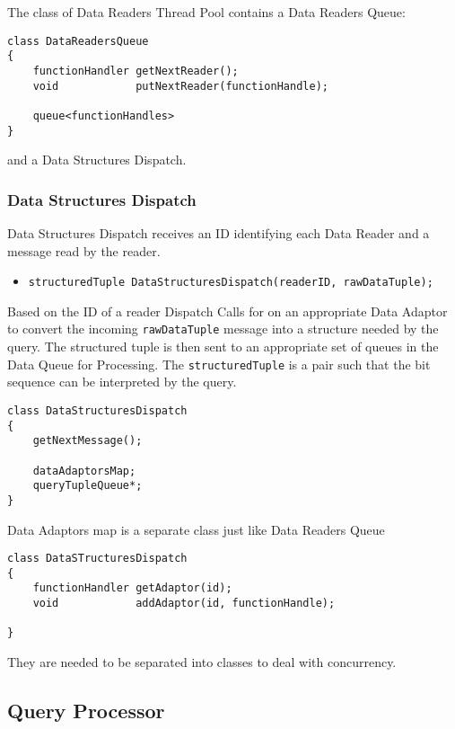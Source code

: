 \documentclass[11pt]{article}
\begin{document}
\noindent The class of Data Readers Thread Pool contains a Data Readers Queue:

\begin{verbatim}
class DataReadersQueue
{
	functionHandler getNextReader();
	void            putNextReader(functionHandle);
	
    queue<functionHandles>
}
\end{verbatim}

\noindent and a Data Structures Dispatch.

\subsubsection{Data Structures Dispatch}

Data Structures Dispatch receives an ID identifying each Data Reader and a message read by the reader. 

\begin{itemize}
	\item {\tt structuredTuple DataStructuresDispatch(readerID, rawDataTuple);}
\end{itemize}

Based on the ID of a reader Dispatch Calls for on an appropriate Data Adaptor to convert the incoming {\tt rawDataTuple} message into a structure needed by the query. The structured tuple is then sent to an appropriate set of queues in the Data Queue for Processing. The {\tt structuredTuple} is a pair {\tt <size, bit-sequence>} such that the bit sequence can be interpreted by the query. 

\begin{verbatim}
class DataStructuresDispatch
{
	getNextMessage();
	
    dataAdaptorsMap;
    queryTupleQueue*;
}
\end{verbatim}

\noindent Data Adaptors map is a separate class just like Data Readers Queue

\begin{verbatim}
class DataSTructuresDispatch
{
    functionHandler getAdaptor(id);
    void            addAdaptor(id, functionHandle);
	
}
\end{verbatim}
\noindent They are needed to be separated into classes to deal with concurrency.

\subsection{Query Processor}
\end{document}
